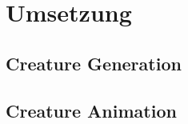 \chapter{Umsetzung}
\label{Technische_Umsetzung}

\section{Creature Generation}


\section{Creature Animation}


